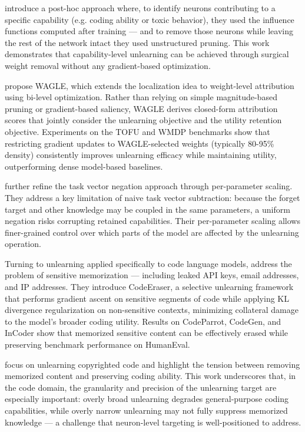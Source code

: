 \documentclass[mscthesis]{usiinfthesis}
\begin{document}
\citet{pochinkov2024dissectinglanguagemodelsmachine} introduce a post-hoc approach where, to identify neurons contributing to a specific capability (e.g. coding ability or toxic behavior), they used the influence functions computed after training  — and to remove those neurons while leaving the rest of the network intact they used unstructured pruning. This work demonstrates that capability-level unlearning can be achieved through surgical weight removal without any gradient-based optimization.
\par\vspace{1em}
\citet{jia2025waglestrategicweightattribution} propose WAGLE, which extends the localization idea to weight-level attribution using bi-level optimization. Rather than relying on simple magnitude-based pruning or gradient-based saliency, WAGLE derives closed-form attribution scores that jointly consider the unlearning objective and the utility retention objective. Experiments on the TOFU and WMDP benchmarks show that restricting gradient updates to WAGLE-selected weights (typically 80-95\% density) consistently improves unlearning efficacy while maintaining utility, outperforming dense model-based baselines.
\par\vspace{1em}
\citet{cai2026perparametertaskarithmeticunlearning} further refine the task vector negation approach through per-parameter scaling. They address a key limitation of naive task vector subtraction: because the forget target and other knowledge may be coupled in the same parameters, a uniform negation risks corrupting retained capabilities. Their per-parameter scaling allows finer-grained control over which parts of the model are affected by the unlearning operation.
\par\vspace{1em}
Turning to unlearning applied specifically to code language models, \citet{chu2026scrubitouterasingsensitivememorization} address the problem of sensitive memorization — including leaked API keys, email addresses, and IP addresses. They introduce CodeEraser, a selective unlearning framework that performs gradient ascent on sensitive segments of code while applying KL divergence regularization on non-sensitive contexts, minimizing collateral damage to the model's broader coding utility. Results on CodeParrot, CodeGen, and InCoder show that memorized sensitive content can be effectively erased while preserving benchmark performance on HumanEval.
\par\vspace{1em}
\citet{jiang2025largelanguagemodelunlearning} focus on unlearning copyrighted code and highlight the tension between removing memorized content and preserving coding ability. This work underscores that, in the code domain, the granularity and precision of the unlearning target are especially important: overly broad unlearning degrades general-purpose coding capabilities, while overly narrow unlearning may not fully suppress memorized knowledge — a challenge that neuron-level targeting is well-positioned to address.
\end{document}

